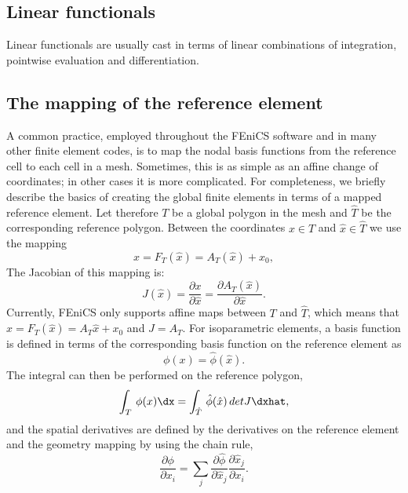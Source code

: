 \subsection{Linear functionals}

Linear functionals are usually cast in terms of linear combinations of
integration, pointwise evaluation and differentiation.


\subsection{The mapping of the reference element}

A common practice, employed throughout the FEniCS software and in many
other finite element codes, is to map the nodal basis functions from the
reference cell to each cell in a mesh.  Sometimes, this is as simple as
an affine change of coordinates; in other cases it is more complicated.
For completeness, we briefly describe the basics of creating the global
finite elements in terms of a mapped reference element. Let therefore
$T$ be a global polygon in the mesh and $\hat{T}$ be the corresponding
reference polygon.  Between the coordinates $x\in T$ and $\hat x\in\hat T$
we use the mapping
\begin{equation}
\label{eq:geometry}
x = F_T(\hat x) = A_T(\hat x)  + x_0,
\end{equation}
The Jacobian of this mapping is:
\begin{equation}
\label{eq:geometry2}
J(\hat x) =  \frac{\partial x }{\partial \hat x}  =    \frac{\partial A_T(\hat x) }{\partial \hat x} .
\end{equation}
Currently, FEniCS only supports affine maps between $T$ and $\hat{T}$,
which means that $x = F_T(\hat x) = A_T\hat x + x_0$ and $J=A_T$.
For isoparametric elements, a basis function is defined in terms of the
corresponding basis function on the reference element as
\begin{equation}
\phi(x) = \hat{\phi}(\hat x).
\end{equation}
The integral can then be performed on the reference polygon,
\begin{equation}
\label{eq:integration2}
\int_T \, \phi (x) \dx = \int_{\hat{T}} \, \hat \phi (\hat x) \, detJ \dxhat ,
\end{equation}
and the spatial derivatives are defined by the derivatives on the
reference element and the geometry mapping by using the chain rule,
\begin{equation}
\label{eq:chain}
\frac{\partial \phi}{\partial x_i} =
\sum_j \frac{\partial \hat \phi}{\partial \hat x_j} \frac{\partial \hat x_j }{\partial x_i }  .
\end{equation}

